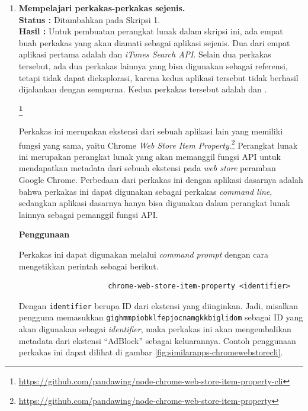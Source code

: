 \documentclass[a4paper,twoside]{article}
\begin{document}
\begin{enumerate}
		\item \textbf{Mempelajari perkakas-perkakas \cl sejenis.}\\
		{\bf Status :} Ditambahkan pada Skripsi 1.\\
		{\bf Hasil :} Untuk pembuatan perangkat lunak dalam skripsi ini, ada empat buah perkakas \cl yang akan diamati sebagai aplikasi sejenis. Dua dari empat aplikasi pertama adalah \chromewebstorecli dan \textit{iTunes Search API}. Selain dua perkakas tersebut, ada dua perkakas lainnya yang bisa digunakan sebagai referensi, tetapi tidak dapat dieksplorasi, karena kedua aplikasi tersebut tidak berhasil dijalankan dengan sempurna. Kedua perkakas tersebut adalah \ubercli dan \googlemapscli .

\large{\textbf{\chromewebstorecli\footnote{\href{https://github.com/pandawing/node-chrome-web-store-item-property-cli}{https://github.com/pandawing/node-chrome-web-store-item-property-cli}}}}
\label{sec:similarapps-chromewebstore}

Perkakas \cl ini merupakan ekstensi dari sebuah aplikasi lain yang memiliki fungsi yang sama, yaitu Chrome \textit{Web Store Item Property}.\footnote{\href{https://github.com/pandawing/node-chrome-web-store-item-property}{https://github.com/pandawing/node-chrome-web-store-item-property}} Perangkat lunak \chromewebstorecli ini merupakan perangkat lunak yang akan memanggil fungsi API untuk mendapatkan metadata dari sebuah ekstensi pada \textit{web store} peramban Google Chrome. Perbedaan dari perkakas ini dengan aplikasi dasarnya adalah bahwa perkakas ini dapat digunakan sebagai perkakas \textit{command line}, sedangkan aplikasi dasarnya hanya bisa digunakan dalam perangkat lunak lainnya sebagai pemanggil fungsi API.

\textbf{Penggunaan}
\label{sec:similarapps-chromewebstore-usage}

Perkakas ini dapat digunakan melalui \textit{command prompt} dengan cara mengetikkan perintah sebagai berikut.

\begin{verbatim}
                     chrome-web-store-item-property <identifier>
\end{verbatim}

Dengan \verb|identifier| berupa ID dari ekstensi yang diinginkan. Jadi, misalkan pengguna memasukkan \verb|gighmmpiobklfepjocnamgkkbiglidom| sebagai ID yang akan digunakan sebagai \textit{identifier}, maka perkakas ini akan mengembalikan metadata dari ekstensi ``AdBlock'' sebagai keluarannya. Contoh penggunaan perkakas ini dapat dilihat di gambar \ref{fig:similarapps-chromewebstorecli}.


\end{enumerate}
\end{document}
